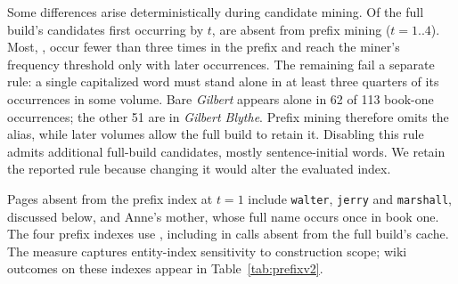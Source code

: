 Some differences arise deterministically during candidate mining. Of the full build's
candidates first occurring by $t$,  are absent from prefix mining
($t=1..4$). Most, , occur fewer than three times in the prefix and
reach the miner's frequency threshold only with later occurrences. The remaining
 fail a separate rule: a single capitalized word must stand alone
in at least three quarters of its occurrences in some volume. Bare \emph{Gilbert}
appears alone in 62 of 113 book-one occurrences; the other 51 are in
\emph{Gilbert Blythe}. Prefix mining therefore omits the alias, while later volumes
allow the full build to retain it. Disabling this rule admits 
additional full-build candidates, mostly sentence-initial words. We retain the reported
rule because changing it would alter the evaluated index.

Pages absent from the prefix index at $t=1$ include \texttt{walter}, \texttt{jerry}
and \texttt{marshall}, discussed below, and Anne's mother, whose full name occurs once
in book one. The four prefix indexes use , including
 in calls absent from the full build's cache.
The measure captures entity-index sensitivity to construction scope; wiki outcomes
on these indexes appear in Table~\ref{tab:prefixv2}.

